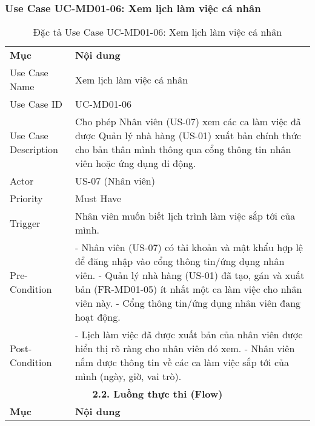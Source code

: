 \subsubsection{Use Case UC-MD01-06: Xem lịch làm việc cá nhân}
\begin{longtable}{|m{4cm}|p{11cm}|}
\caption{Đặc tả Use Case UC-MD01-06: Xem lịch làm việc cá nhân} \label{tab:uc_md01_06} \\
\hline

\endhead %

\hline
\endfoot %

\hline
\endlastfoot %
\multicolumn{2}{|c|}{\textbf{2.1. Tóm tắt (Summary)}} \\
\hline
\textbf{Mục} & \textbf{Nội dung} \\
\hline
Use Case Name & Xem lịch làm việc cá nhân \\
\hline
Use Case ID & UC-MD01-06 \\
\hline
Use Case Description & Cho phép Nhân viên (US-07) xem các ca làm việc đã được Quản lý nhà hàng (US-01) xuất bản chính thức cho bản thân mình thông qua cổng thông tin nhân viên hoặc ứng dụng di động. \\
\hline
Actor & US-07 (Nhân viên) \\
\hline
Priority & Must Have \\
\hline
Trigger & Nhân viên muốn biết lịch trình làm việc sắp tới của mình. \\
\hline
Pre-Condition & - Nhân viên (US-07) có tài khoản và mật khẩu hợp lệ để đăng nhập vào cổng thông tin/ứng dụng nhân viên. \newline - Quản lý nhà hàng (US-01) đã tạo, gán và xuất bản (FR-MD01-05) ít nhất một ca làm việc cho nhân viên này. \newline - Cổng thông tin/ứng dụng nhân viên đang hoạt động. \\
\hline
Post-Condition & - Lịch làm việc đã được xuất bản của nhân viên được hiển thị rõ ràng cho nhân viên đó xem. \newline - Nhân viên nắm được thông tin về các ca làm việc sắp tới của mình (ngày, giờ, vai trò). \\
\hline
\multicolumn{2}{|c|}{\textbf{2.2. Luồng thực thi (Flow)}} \\
\hline
\textbf{Mục} & \textbf{Nội dung} \\
\hline

\end{longtable}
